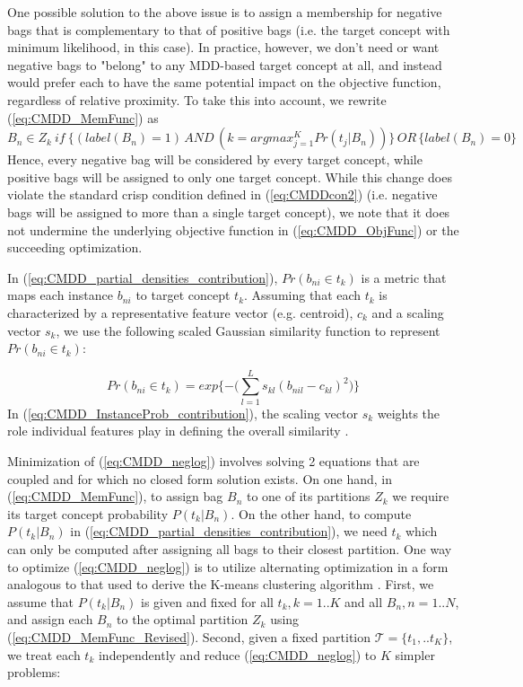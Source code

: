 \documentclass[12pt,dvips]{report}
\numberwithin{equation}{section}
\begin{document}
One possible solution to the above issue is to assign a membership for negative bags that is complementary to that of positive bags (i.e. the target concept with minimum likelihood, in this case).  In practice, however, we don't need or want negative bags to "belong" to any MDD-based target concept at all, and instead would prefer each to have the same potential impact on the objective function, regardless of relative proximity.  To take this into account, we rewrite  (\ref{eq:CMDD_MemFunc}) as
\begin{equation} \label{eq:CMDD_MemFunc_Revised}
B_{n} \in Z_{k} \: if \: \{ (label(B_{n})\!\!=\!\!1)\, AND \, (k = argmax_{j=1}^{K}Pr(t_{j}\vert B_{n})) \} \,OR\, \{ label(B_{n})\!\!=\!\!0\}
\end{equation} Hence, every negative bag  will be considered by every target concept, while positive bags will be assigned to only one target concept.  While this change does violate the standard crisp condition defined in (\ref{eq:CMDDcon2}) (i.e. negative bags will be assigned to more than a single target concept), we note that it does not undermine the underlying objective function in (\ref{eq:CMDD_ObjFunc}) or the succeeding optimization.

In (\ref{eq:CMDD_partial_densities_contribution}), $Pr(b_{ni}\in t_{k})$ is a metric that maps each instance $b_{ni}$ to target concept $t_k$. Assuming that each $t_k$ is characterized by a representative feature vector (e.g. centroid), $c_{k}$ and a scaling vector $s_{k}$, we use the following scaled Gaussian similarity function to represent $Pr(b_{ni}\in t_{k})$:

\begin{equation} \label{eq:CMDD_InstanceProb_contribution}
Pr(b_{ni}\in t_{k})=exp\{-\big(\sum_{l=1}^{L}s_{kl}(b_{nil}-c_{kl})^{2}\big)\}
\end{equation}  In (\ref {eq:CMDD_InstanceProb_contribution}), the scaling vector $s_{k}$ weights the role individual features play
in defining the overall similarity \cite{maro98}.

Minimization of (\ref{eq:CMDD_neglog}) involves solving 2 equations that are coupled and for which no closed form solution exists.  On one hand, in (\ref{eq:CMDD_MemFunc}), to assign bag $B_{n}$ to one of its partitions $Z_{k}$ we require its target concept probability $P(t_{k}\vert B_{n})$.  On the other hand, to compute $P(t_{k}\vert B_{n})$ in (\ref{eq:CMDD_partial_densities_contribution}), we need $t_{k}$ which can only be computed after assigning all bags to their closest partition.  One way to optimize (\ref{eq:CMDD_neglog}) is to utilize alternating optimization in a form analogous to that used to derive the K-means clustering algorithm \cite{macqueen1967kmeans}.  First, we assume that $P(t_{k}\vert B_{n})$ is given and fixed for all $t_{k},k=1..K$ and all $B_{n},n=1..N$, and assign each $B_{n}$ to the optimal partition $Z_{k}$ using (\ref{eq:CMDD_MemFunc_Revised}).  Second, given a fixed partition $\mathcal{T}=\{t_{1},..t_{K}\}$, we treat each $t_{k}$ independently and reduce (\ref{eq:CMDD_neglog}) to $K$ simpler problems:
\end{document}
